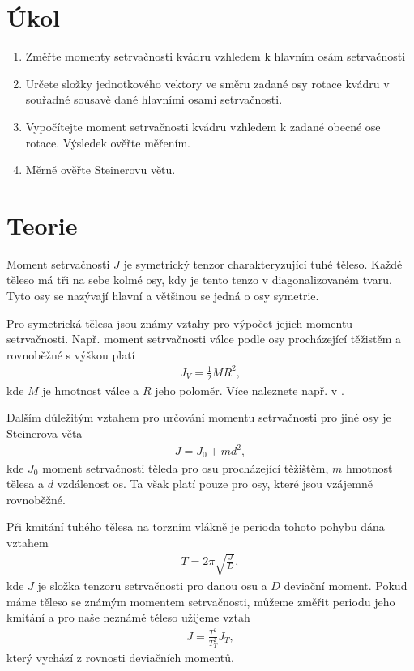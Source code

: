 \documentclass[a4paper,12pt]{article}
\begin{document}
\section{Úkol}
\noindent
\begin{enumerate}
	\item Změřte momenty setrvačnosti kvádru vzhledem k hlavním osám setrvačnosti
	\item Určete složky jednotkového vektory ve směru zadané osy rotace kvádru 
	v souřadné sousavě dané hlavními osami setrvačnosti.
	\item Vypočítejte moment setrvačnosti kvádru vzhledem k zadané obecné ose 
	rotace. Výsledek ověřte měřením.
	\item Měrně ověřte Steinerovu větu.
\end{enumerate}

\section{Teorie}
\noindent
Moment setrvačnosti $J$ je symetrický tenzor charakteryzující tuhé těleso. Každé těleso 
má tři na sebe kolmé osy, kdy je tento tenzo v diagonalizovaném tvaru. Tyto osy se 
nazývají hlavní a většinou se jedná o osy symetrie.

Pro symetrická tělesa jsou známy vztahy pro výpočet jejich momentu setrvačnosti. Např. 
moment setrvačnosti válce podle osy procházející těžistěm a rovnoběžné s výškou platí
\begin{eqnarray}
	J_V=\frac{1}{2}MR^2,
\end{eqnarray}
kde $M$ je hmotnost válce a $R$ jeho poloměr. Více naleznete např. v \cite{Kvasnica}.

Dalším důležitým vztahem pro určování momentu setrvačnosti pro jiné osy je Steinerova věta
\begin{eqnarray}
	J=J_0+md^2,
\end{eqnarray}
kde $J_0$ moment setrvačnosti těleda pro osu procházející těžištěm, $m$ hmotnost tělesa 
a $d$ vzdálenost os. Ta však platí pouze pro osy, které jsou vzájemně rovnoběžné.

Při kmitání tuhého tělesa na torzním vlákně je perioda tohoto pohybu dána vztahem
\begin{eqnarray}
	T=2\pi \sqrt{\frac{J}{D}},
\end{eqnarray}
kde $J$ je složka tenzoru setrvačnosti pro danou osu a $D$ deviační moment.
Pokud máme těleso se známým momentem setrvačnosti, můžeme změřit periodu jeho kmitání 
a pro naše neznámé těleso užijeme vztah
\begin{eqnarray}
	J=\frac{T^2}{T_T^2}J_T,
	\label{vypocet J}
\end{eqnarray}
který vychází z rovnosti deviačních momentů. 
\end{document}
